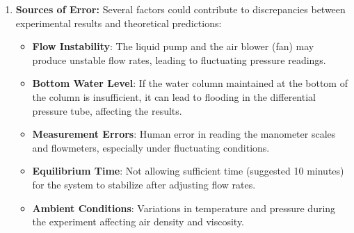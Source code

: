 \begin{enumerate}
    \item \textbf{Sources of Error:}
    Several factors could contribute to discrepancies between experimental results and theoretical predictions:
    \begin{itemize}
        \item \textbf{Flow Instability}: The liquid pump and the air blower (fan) may produce unstable flow rates, leading to fluctuating pressure readings.
        \item \textbf{Bottom Water Level}: If the water column maintained at the bottom of the column is insufficient, it can lead to flooding in the differential pressure tube, affecting the results.
        \item \textbf{Measurement Errors}: Human error in reading the manometer scales and flowmeters, especially under fluctuating conditions.
        \item \textbf{Equilibrium Time}: Not allowing sufficient time (suggested 10 minutes) for the system to stabilize after adjusting flow rates.
        \item \textbf{Ambient Conditions}: Variations in temperature and pressure during the experiment affecting air density and viscosity.
    \end{itemize}
\end{enumerate}
